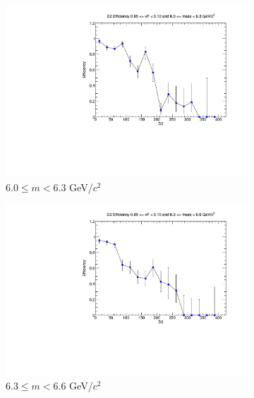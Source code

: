 \documentclass[11pt]{article}
\begin{document}
\begin{figure}[p]
\begin{subfigure}[b]{0.32\textwidth}
        \includegraphics[width=\textwidth]{./kTrackerEfficiencyPlots/D2_Efficiency_xF1_mass6.pdf}
        \caption{$6.0 \leq m < 6.3$ GeV/$c^2$}
    \end{subfigure}\hfill
    \begin{subfigure}[b]{0.32\textwidth}
        \centering
        \includegraphics[width=\textwidth]{./kTrackerEfficiencyPlots/D2_Efficiency_xF1_mass7.pdf}
        \caption{$6.3 \leq m < 6.6$ GeV/$c^2$}
    \end{subfigure}\hfill
    \begin{subfigure}[b]{0.32\textwidth}
        \centering

\end{subfigure}
\end{figure}
\end{document}
